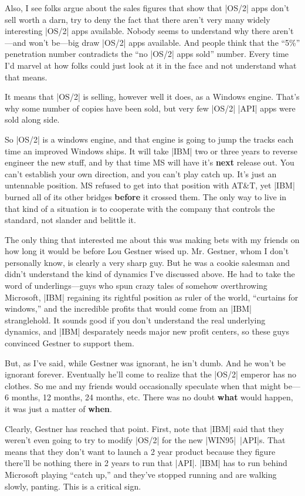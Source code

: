 Also, I see folks argue about the sales figures
that show that |OS/2| apps don't sell worth a darn, try to deny the fact that
there aren't very many widely interesting |OS/2| apps available.  Nobody
seems to understand why there aren't---and won't be---big draw |OS/2| apps
available.  And people think that the ``5\%'' penetration number contradicts
the ``no |OS/2| apps sold'' number.  Every time I'd marvel at how folks
could just look at it in the face and not understand what that means.

It means that |OS/2| is selling, however well it does, as a Windows engine.
That's why some number of copies have been sold, but very few |OS/2|
|API| apps were sold along side.

So |OS/2| is a windows engine, 
and that engine is going to jump the tracks each time an improved
Windows ships.  It will take |IBM| two or three years to reverse engineer
the new stuff, and by that time MS will have it's {\bf next} release out.
You can't establish your own direction, and you can't play catch up.
It's just an untennable position.  MS refused to get into that position
with AT\&T, yet |IBM| burned all of its other bridges {\bf before} it crossed
them.  The only way to live in that kind of a situation is to cooperate
with the company that controls the standard, not slander and belittle it.

The only thing that interested me about this was making bets with my friends 
on how long it would be before Lou Gestner wised up.  Mr. Gestner, whom
I don't personally know, is clearly a very sharp guy.  But he was a
cookie salesman and didn't understand the kind of dynamics I've discussed
above.  He had to take the word of underlings---guys who spun crazy
tales of somehow overthrowing Microsoft, |IBM| regaining its rightful
position as ruler of the world, ``curtains for windows,'' and the 
incredible profits that would come from an |IBM| stranglehold.  It sounds
good if you don't understand the real underlying dynamics, and |IBM|
desparately needs major new profit centers, so these guys convinced
Gestner to support them.  

But, as I've said, while Gestner was ignorant, he isn't dumb.  And he
won't be ignorant forever.  Eventually he'll come to realize that
the |OS/2| emperor has no clothes.  So me and my friends would occasionally
speculate when that might be---6 months, 12 months, 24 months, etc.
There was no doubt {\bf what} would happen, it was just a matter of
{\bf when}.

Clearly, Gestner has reached that point.  First, note that |IBM| said that
they weren't even going to try to modify |OS/2| for the new |WIN95|~|API|s.
That means that they don't want to launch a 2 year product because
they figure there'll be nothing there in 2 years to run that |API|.
|IBM| has to run behind Microsoft playing ``catch up,'' and they've stopped
running and are walking slowly, panting.  This is a critical sign.

